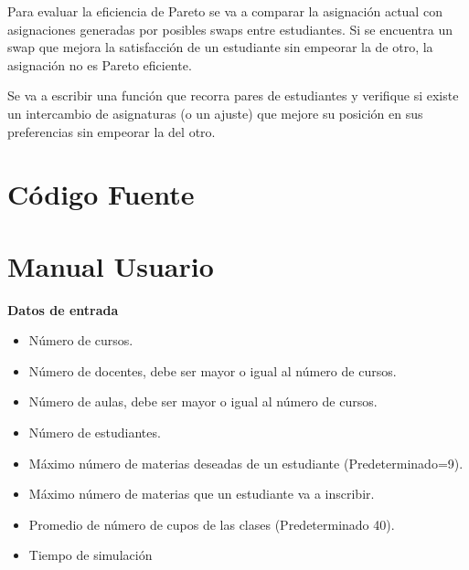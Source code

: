 \documentclass{article}
\begin{document}
Para evaluar la eficiencia de Pareto se va a comparar la asignación actual con asignaciones 
generadas por posibles swaps entre estudiantes. Si se encuentra un swap que mejora la 
satisfacción de un estudiante sin empeorar la de otro, la asignación no es Pareto eficiente.

Se va a escribir una función que recorra pares de estudiantes y verifique si existe un 
intercambio de asignaturas (o un ajuste) que mejore su posición en sus preferencias 
sin empeorar la del otro.



\section{Código Fuente}\label{sec:cod}



\section{Manual Usuario}\label{sec:man_u}

\textbf{Datos de entrada}

\begin{itemize}
  \item Número de cursos.
  \item Número de docentes, debe ser mayor o igual al número de cursos.
  \item Número de aulas, debe ser mayor o igual al número de cursos.
  \item Número de estudiantes.
  \item Máximo número de materias deseadas de un estudiante (Predeterminado=9).
  \item Máximo número de materias que un estudiante va a inscribir.
  \item Promedio de número de cupos de las clases (Predeterminado 40).
  \item Tiempo de simulación
\end{itemize}


\end{document}
